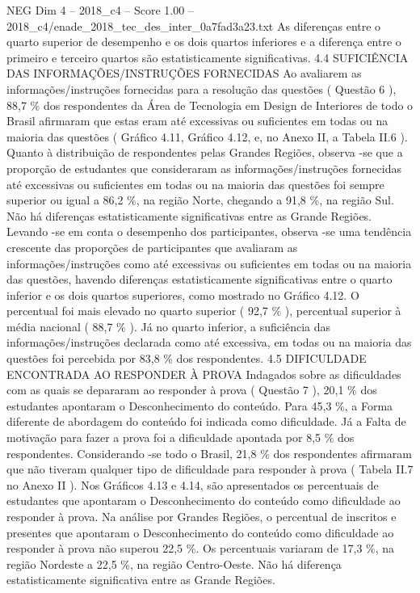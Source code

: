 \begin{textsample}{NEG Dim 4 – 2018\_c4 – Score 1.00 – 2018\_c4/enade\_2018\_tec\_des\_inter\_0a7fad3a23.txt}
As diferenças entre o quarto superior de desempenho e os dois quartos inferiores e a diferença entre o primeiro e terceiro quartos são estatisticamente significativas. 4.4 SUFICIÊNCIA DAS INFORMAÇÕES/INSTRUÇÕES FORNECIDAS Ao avaliarem as informações/instruções fornecidas para a resolução das questões ( Questão 6 ), 88,7 \% dos respondentes da Área de Tecnologia em Design de Interiores de todo o Brasil afirmaram que estas eram até excessivas ou suficientes em todas ou na maioria das questões ( Gráfico 4.11, Gráfico 4.12, e, no Anexo II, a Tabela II.6 ).
Quanto à distribuição de respondentes pelas Grandes Regiões, observa -se que a proporção de estudantes que consideraram as informações/instruções fornecidas até excessivas ou suficientes em todas ou na maioria das questões foi sempre superior ou igual a 86,2 \%, na região Norte, chegando a 91,8 \%, na região Sul.
Não há diferenças estatisticamente significativas entre as Grande Regiões.
Levando -se em conta o desempenho dos participantes, observa -se uma tendência crescente das proporções de participantes que avaliaram as informações/instruções como até excessivas ou suficientes em todas ou na maioria das questões, havendo diferenças estatisticamente significativas entre o quarto inferior e os dois quartos superiores, como mostrado no Gráfico 4.12.
O percentual foi mais elevado no quarto superior ( 92,7 \% ), percentual superior à média nacional ( 88,7 \% ).
Já no quarto inferior, a suficiência das informações/instruções declarada como até excessiva, em todas ou na maioria das questões foi percebida por 83,8 \% dos respondentes. 4.5 DIFICULDADE ENCONTRADA AO RESPONDER À PROVA Indagados sobre as dificuldades com as quais se depararam ao responder à prova ( Questão 7 ), 20,1 \% dos estudantes apontaram o Desconhecimento do conteúdo.
Para 45,3 \%, a Forma diferente de abordagem do conteúdo foi indicada como dificuldade.
Já a Falta de motivação para fazer a prova foi a dificuldade apontada por 8,5 \% dos respondentes.
Considerando -se todo o Brasil, 21,8 \% dos respondentes afirmaram que não tiveram qualquer tipo de dificuldade para responder à prova ( Tabela II.7 no Anexo II ).
Nos Gráficos 4.13 e 4.14, são apresentados os percentuais de estudantes que apontaram o Desconhecimento do conteúdo como dificuldade ao responder à prova.
Na análise por Grandes Regiões, o percentual de inscritos e presentes que apontaram o Desconhecimento do conteúdo como dificuldade ao responder à prova não superou 22,5 \%.
Os percentuais variaram de 17,3 \%, na região Nordeste a 22,5 \%, na região Centro-Oeste.
Não há diferença estatisticamente significativa entre as Grande Regiões.

\end{textsample}
